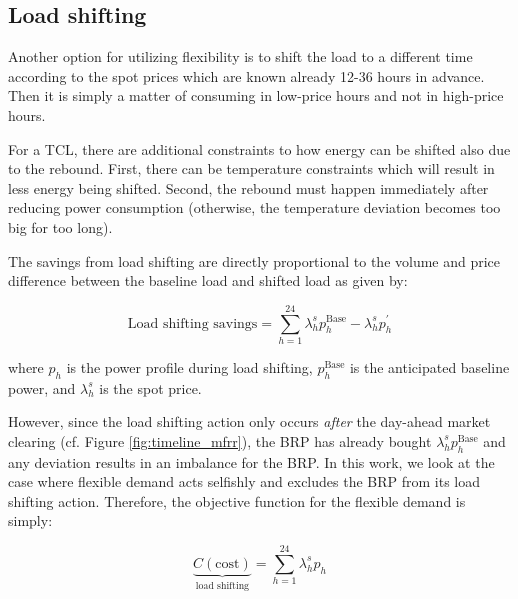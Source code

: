 \subsection{Load shifting}

Another option for utilizing flexibility is to shift the load to a different time according to the spot prices which are known already 12-36 hours in advance. Then it is simply a matter of consuming in low-price hours and not in high-price hours.

For a TCL, there are additional constraints to how energy can be shifted also due to the rebound. First, there can be temperature constraints which will result in less energy being shifted. Second, the rebound must happen immediately after reducing power consumption (otherwise, the temperature deviation becomes too big for too long).

The savings from load shifting are directly proportional to the volume and price difference between the baseline load and shifted load as given by:

\begin{equation}\label{eq:load_shifting_savings}
    \text{Load shifting savings} = \sum_{h=1}^{24} \lambda^{s}_{h} p^{\text{Base}}_{h} - \lambda^{s}_{h} p^{\prime}_{h}
\end{equation}

where $p_{h}$ is the power profile during load shifting, $p^{\text{Base}}_{h}$ is the anticipated baseline power, and $\lambda^{s}_{h}$ is the spot price.

However, since the load shifting action only occurs \textit{after} the day-ahead market clearing (cf. Figure \ref{fig:timeline_mfrr}), the BRP has already bought $\lambda^{s}_{h} p^{\text{Base}}_{h}$ and any deviation results in an imbalance for the BRP. In this work, we look at the case where flexible demand acts selfishly and excludes the BRP from its load shifting action. Therefore, the objective function for the flexible demand is simply:

\begin{equation}\label{eq:LoadShiftingObjective}
    \underbrace{C(\text{cost})}_{\text{load shifting}} = \sum_{h=1}^{24} \lambda_{h}^{s} p_{h}
\end{equation}
